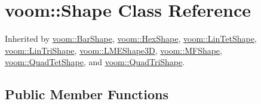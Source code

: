 \hypertarget{classvoom_1_1_shape}{
\section{voom::Shape Class Reference}
\label{classvoom_1_1_shape}
}


Inherited by \hyperlink{classvoom_1_1_bar_shape}{voom::BarShape}, \hyperlink{classvoom_1_1_hex_shape}{voom::HexShape}, \hyperlink{classvoom_1_1_lin_tet_shape}{voom::LinTetShape}, \hyperlink{classvoom_1_1_lin_tri_shape}{voom::LinTriShape}, \hyperlink{classvoom_1_1_l_m_e_shape3_d}{voom::LMEShape3D}, \hyperlink{classvoom_1_1_m_f_shape}{voom::MFShape}, \hyperlink{classvoom_1_1_quad_tet_shape}{voom::QuadTetShape}, and \hyperlink{classvoom_1_1_quad_tri_shape}{voom::QuadTriShape}.\subsection*{Public Member Functions}
